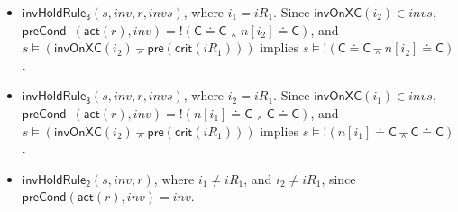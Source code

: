 \documentclass[conference]{IEEEtran}
\def \eqc {\doteq }
\def \andc {\barwedge }
\def \negc {!}
\begin{document}
{\begin{example}
\begin{itemize}[leftmargin=12pt,noitemsep,nolistsep]


 \item   $\mathsf{invHoldRule_3 }(s,inv,r,invs)$, where  $i_1 = iR_1$.
  Since
 $\mathsf{invOnXC}( i_2) \in invs$, $\mathsf{preCond}$\ $(\mathsf{act}(r),inv)=\negc (\mathsf{C}\eqc\mathsf{C}\andc n[i_2]\eqc\mathsf{C})$, and $s \models (\mathsf{invOnXC}( i_2) \andc \mathsf{pre}(\mathsf{crit}(iR_1)))$ implies  $s \models \negc (\mathsf{C}\eqc\mathsf{C}\andc n[i_2]\eqc\mathsf{C})$.


\item   $\mathsf{invHoldRule_3 }(s,inv,r,invs)$, where $i_2 = iR_1$.  Since
 $\mathsf{invOnXC}( i_1) \in invs$, $\mathsf{preCond}$\ $(\mathsf{act}(r),inv)=\negc (n[i_1]\eqc\mathsf{C}\andc \mathsf{C}\eqc\mathsf{C})$, and $s \models (\mathsf{invOnXC}( i_2) \andc \mathsf{pre}(\mathsf{crit}(iR_1)))$ implies  $s \models \negc ( n[i_1]\eqc\mathsf{C}\andc \mathsf{C}\eqc\mathsf{C})$.



\item     $\mathsf{invHoldRule_2 }(s,inv,r)$, where   $i_1 \neq iR_1$, and $i_2 \neq iR_1$, since $\mathsf{preCond}(\mathsf{act}(r),inv)=inv$.

 \end{itemize}
\end{example}





}
\end{document}
